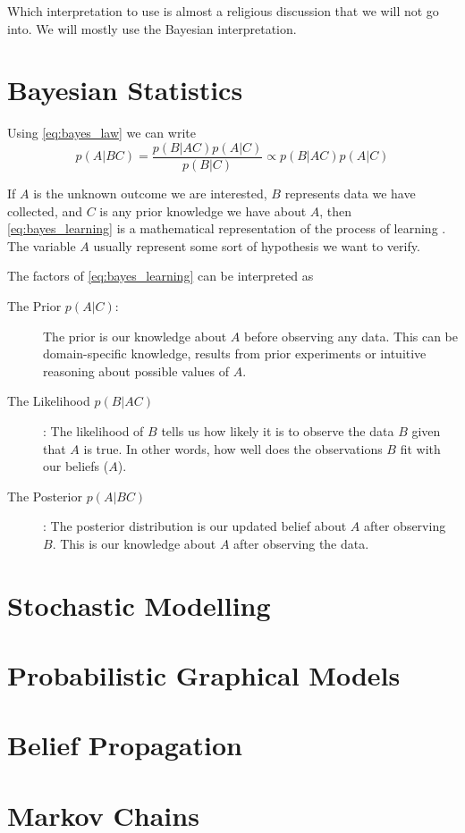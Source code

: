 Which interpretation to use is almost a religious discussion that we will not go into. We will mostly use the Bayesian interpretation.





\section{Bayesian Statistics}

Using \cref{eq:bayes_law} we can write 
\begin{equation}\label{eq:bayes_learning}
    p(A|BC) = \frac{p(B | AC) p(A | C)}{p(B | C)} \propto p(B | AC)p(A | C)
\end{equation}

If $A$ is the unknown outcome we are interested, $B$ represents data we have collected, and $C$ is any prior knowledge we have about $A$, then \cref{eq:bayes_learning} is a mathematical representation of the process of learning \cite{Jaynes86bayesianmethods:}. The variable $A$ usually represent some sort of hypothesis we want to verify. 

The factors of \cref{eq:bayes_learning} can be interpreted as
\begin{description}
    \item[The Prior $p(A | C)$:] The prior is our knowledge about $A$ before observing any data. This can be domain-specific knowledge, results from prior experiments or intuitive reasoning about possible values of $A$. 
    \item[The Likelihood $p(B | AC)$]: The likelihood of $B$ tells us how likely it is to observe the data $B$ given that $A$ is true. In other words, how well does the observations $B$ fit with our beliefs ($A$). 
    \item[The Posterior $p(A | BC)$]: The posterior distribution is our updated belief about $A$ after observing $B$. This is our knowledge about $A$ after observing the data. 
\end{description}

\section{Stochastic Modelling}

\section{Probabilistic Graphical Models}

\section{Belief Propagation}

\section{Markov Chains}

